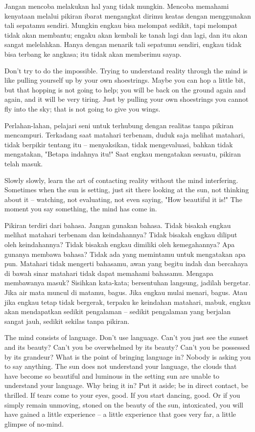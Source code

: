 \bahasa
Jangan mencoba melakukan hal yang tidak mungkin. Mencoba memahami kenyataan melalui pikiran ibarat mengangkat dirimu keatas dengan menggunakan tali sepatamu sendiri. Mungkin engkau bisa melompat sedikit, tapi melompat tidak akan membantu; engaku akan kembali ke tanah lagi dan lagi, dan itu akan sangat melelahkan. Hanya dengan menarik tali sepatumu sendiri, engkau tidak bisa terbang ke angkasa; itu tidak akan memberimu sayap.

\english
Don't try to do the impossible. Trying to understand reality through the mind is like pulling yourself up by your own shoestrings. Maybe you can hop a little bit, but that hopping is not going to help; you will be back on the ground again and again, and it will be very tiring. Just by pulling your own shoestrings you cannot fly into the sky; that is not going to give you wings.

\bahasa
Perlahan-lahan, pelajari seni untuk terhubung dengan realitas tanpa pikiran mencampuri. Terkadang saat matahari terbenam, duduk saja melihat matahari, tidak berpikir tentang itu -- menyaksikan, tidak mengevaluasi, bahkan tidak mengatakan, "Betapa indahnya itu!" Saat engkau mengatakan sesuatu, pikiran telah masuk.

\english
Slowly slowly, learn the art of contacting reality without the mind interfering. Sometimes when the sun is setting, just sit there looking at the sun, not thinking about it -- watching, not evaluating, not even saying, "How beautiful it is!" The moment you say something, the mind has come in.

\bahasa
Pikiran terdiri dari bahasa. Jangan gunakan bahasa. Tidak bisakah engkau melihat matahari terbenam dan keindahannya? Tidak bisakah engkau diliput oleh keindahannya? Tidak bisakah engkau dimiliki oleh kemegahannya? Apa gunanya membawa bahasa? Tidak ada yang memintamu untuk mengatakan apa pun. Matahari tidak mengerti bahasamu, awan yang begitu indah dan bercahaya di bawah sinar matahari tidak dapat memahami bahasamu. Mengapa membawanya masuk? Sisihkan kata-kata; bersentuhan langsung, jadilah bergetar. Jika air mata muncul di matamu, bagus. Jika engkau mulai menari, bagus. Atau jika engkau tetap tidak bergerak, terpaku ke keindahan matahari, mabuk, engkau akan mendapatkan sedikit pengalaman -- sedikit pengalaman yang berjalan sangat jauh, sedikit sekilas tanpa pikiran.

\english
The mind consists of language. Don't use language. Can't you just see the sunset and its beauty? Can't you be overwhelmed by its beauty? Can't you be possessed by its grandeur? What is the point of bringing language in? Nobody is asking you to say anything. The sun does not understand your language, the clouds that have become so beautiful and luminous in the setting sun are unable to understand your language. Why bring it in? Put it aside; be in direct contact, be thrilled. If tears come to your eyes, good. If you start dancing, good. Or if you simply remain unmoving, stoned on the beauty of the sun, intoxicated, you will have gained a little experience -- a little experience that goes very far, a little glimpse of no-mind.

